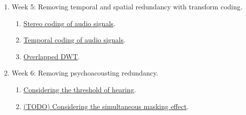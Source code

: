 \begin{enumerate}
\begin{enumerate}
\end{enumerate}
\item Week 5: Removing temporal and spatial redundancy with transform coding.
\begin{enumerate}
\item \href{https://tecnologias-multimedia.github.io/study_guide/11-stereo_coding/}{Stereo coding of audio signals}.
\item \href{https://tecnologias-multimedia.github.io/study_guide/12-temporal_coding/}{Temporal coding of audio signals}.
\item \href{https://tecnologias-multimedia.github.io/study_guide/13-overlapped_temporal_coding/}{Overlapped DWT}.
\end{enumerate}
\item Week 6: Removing psychoacousting redundancy.
\begin{enumerate}
\item \href{https://tecnologias-multimedia.github.io/study_guide/14-threshold_of_hearing/}{Considering the threshold of hearing}.
\item \href{https://tecnologias-multimedia.github.io/study_guide/15-simultaneous_masking/}{(TODO) Considering the simultaneous masking effect}.
\end{enumerate}
\end{enumerate}
